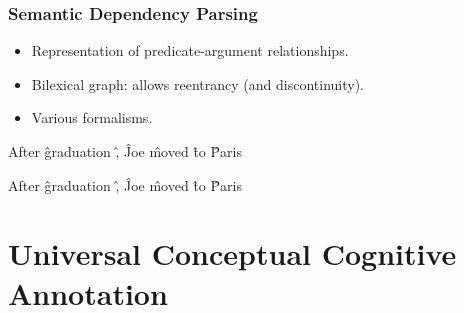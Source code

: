 \documentclass[t]{beamer}
\begin{document}
\begin{frame}
\frametitle{Semantic Dependency Parsing}
\begin{itemize}
	\item Representation of predicate-argument relationships.
	\item Bilexical graph: allows reentrancy (and discontinuity).
	\item Various formalisms.
\end{itemize}
\vfill

\begin{adjustbox}{scale=.9,frame,center}
\begin{dependency}
	\begin{deptext}[column sep=1.5em,ampersand replacement=\^,font=\rmfamily]
	After \^ graduation \^ , \^ Joe \^ moved \^ to \^ Paris \\
	\end{deptext}
\end{dependency}
\end{adjustbox}

\pause
\begin{adjustbox}{scale=.9,frame,center}
\begin{dependency}
	\begin{deptext}[column sep=1.5em,ampersand replacement=\^,font=\rmfamily]
	After \^ graduation \^ , \^ Joe \^ moved \^ to \^ Paris \\
	\end{deptext}
\end{dependency}
\end{adjustbox}
\end{frame}


\section{Universal Conceptual Cognitive Annotation}
\end{document}
